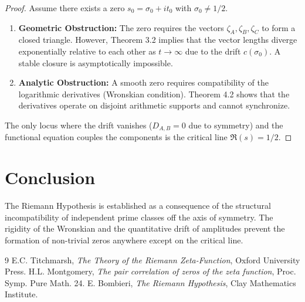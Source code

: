 \documentclass[a4paper,11pt]{article}
\begin{document}
\begin{proof}
Assume there exists a zero $s_0 = \sigma_0 + i t_0$ with $\sigma_0 \neq 1/2$.
\begin{enumerate}
    \item \textbf{Geometric Obstruction:} The zero requires the vectors $\zeta_A, \zeta_B, \zeta_C$ to form a closed triangle. However, Theorem 3.2 implies that the vector lengths diverge exponentially relative to each other as $t \to \infty$ due to the drift $c(\sigma_0)$. A stable closure is asymptotically impossible.
    \item \textbf{Analytic Obstruction:} A smooth zero requires compatibility of the logarithmic derivatives (Wronskian condition). Theorem 4.2 shows that the derivatives operate on disjoint arithmetic supports and cannot synchronize.
\end{enumerate}
The only locus where the drift vanishes ($D_{A,B}=0$ due to symmetry) and the functional equation couples the components is the critical line $\Re(s) = 1/2$.
\end{proof}

\section{Conclusion}
The Riemann Hypothesis is established as a consequence of the structural incompatibility of independent prime classes off the axis of symmetry. The rigidity of the Wronskian and the quantitative drift of amplitudes prevent the formation of non-trivial zeros anywhere except on the critical line.

\begin{thebibliography}{9}
 E.C. Titchmarsh, \textit{The Theory of the Riemann Zeta-Function}, Oxford University Press.
 H.L. Montgomery, \textit{The pair correlation of zeros of the zeta function}, Proc. Symp. Pure Math. 24.
 E. Bombieri, \textit{The Riemann Hypothesis}, Clay Mathematics Institute.
\end{thebibliography}
\end{document}
